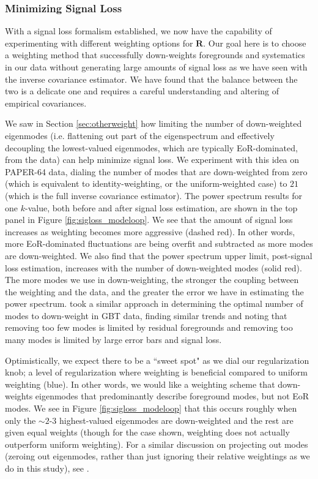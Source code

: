 \documentclass[preprint2,numberedappendix,tighten]{aastex6}  %
\begin{document}
\subsubsection{Minimizing Signal Loss}
\label{sec:Weight}

With a signal loss formalism established, we now have the capability of experimenting 
with different weighting options for $\textbf{R}$. Our goal here is to choose a weighting method that successfully down-weights 
foregrounds and systematics in our data without generating large amounts of signal loss as we have seen with the inverse covariance estimator. We have found that the balance 
between the two is a delicate one and requires a careful understanding and altering of empirical covariances. 

We saw in Section \ref{sec:otherweight} how limiting the number of down-weighted eigenmodes (i.e. flattening out part of the 
eigenspectrum and effectively decoupling the lowest-valued eigenmodes, which are typically EoR-dominated, from the data) can help minimize signal loss. We experiment with this idea on PAPER-64 data, dialing the number of modes 
that are down-weighted from zero (which is equivalent to identity-weighting, or the uniform-weighted case) to $21$ (which is the full inverse 
covariance estimator). The power spectrum results for one $k$-value, both before and after signal loss 
estimation, are shown in the top panel in Figure \ref{fig:sigloss_modeloop}. We see that the amount of signal loss increases as weighting 
becomes more aggressive (dashed red). In other words, more EoR-dominated fluctuations are being overfit and 
subtracted as more modes are down-weighted. We also find that the power spectrum upper limit, post-signal loss estimation, 
increases with the number of down-weighted modes (solid red). The more modes we use in down-weighting, the stronger the coupling between the weighting and the data, and the greater the error we have in estimating the power spectrum. \citet{switzer_et_al2013} took a similar approach in determining the optimal number of modes to down-weight in GBT data, finding similar trends and noting that removing too few modes is limited by residual foregrounds and removing too many modes is limited by large error bars and signal loss.

Optimistically, we expect there to be a ``sweet spot" as we dial our regularization knob; a level of regularization where weighting 
is beneficial compared to uniform weighting (blue). In other words, we would like a weighting scheme that down-weights eigenmodes that predominantly describe foreground modes, but not EoR modes. We see in Figure \ref{fig:sigloss_modeloop} that this occurs roughly when 
only the $\sim2$-$3$ highest-valued eigenmodes are down-weighted and the rest are given equal weights (though for the case shown, weighting does not actually outperform uniform weighting). For a similar discussion on projecting out modes (zeroing out eigenmodes, rather than just ignoring their relative weightings as we do in this study), see \citet{switzer_et_al2013}. 
\end{document}
